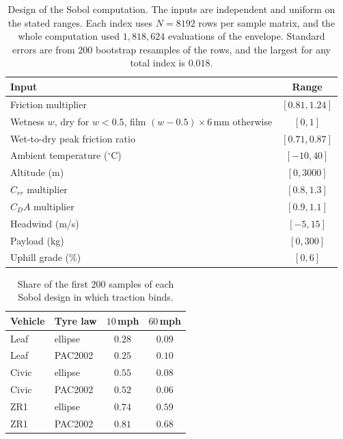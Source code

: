 \begin{table}[htbp]
\centering\small
\caption{Design of the Sobol computation. The inputs are independent and uniform on the stated ranges. Each index uses $N=8192$ rows per sample matrix, and the whole computation used $1{,}818{,}624$ evaluations of the envelope. Standard errors are from $200$ bootstrap resamples of the rows, and the largest for any total index is $0.018$.}\label{tab:app-sobol-design}
\begin{tabular}{lc}
\toprule
Input & Range\\
\midrule
Friction multiplier & $[0.81,1.24]$\\
Wetness $w$, dry for $w<0.5$, film $(w-0.5)\times6$\,mm otherwise & $[0,1]$\\
Wet-to-dry peak friction ratio & $[0.71,0.87]$\\
Ambient temperature ($^\circ$C) & $[-10,40]$\\
Altitude (m) & $[0,3000]$\\
$C_{rr}$ multiplier & $[0.8,1.3]$\\
$C_DA$ multiplier & $[0.9,1.1]$\\
Headwind (m/s) & $[-5,15]$\\
Payload (kg) & $[0,300]$\\
Uphill grade (\%) & $[0,6]$\\
\bottomrule
\end{tabular}
\end{table}

\begin{table}[htbp]
\centering\small
\caption{Share of the first $200$ samples of each Sobol design in which traction binds.}\label{tab:app-sobol-regime}
\begin{tabular}{llcc}
\toprule
Vehicle & Tyre law & $10$\,mph & $60$\,mph\\
\midrule
Leaf & ellipse & $0.28$ & $0.09$\\
Leaf & PAC2002 & $0.25$ & $0.10$\\
Civic & ellipse & $0.55$ & $0.08$\\
Civic & PAC2002 & $0.52$ & $0.06$\\
ZR1 & ellipse & $0.74$ & $0.59$\\
ZR1 & PAC2002 & $0.81$ & $0.68$\\
\bottomrule
\end{tabular}
\end{table}
